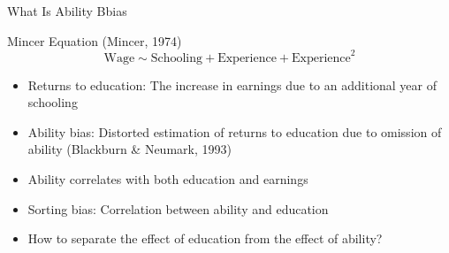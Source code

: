 \documentclass{beamer} %
\begin{document}
\begin{frame}{What Is Ability Bbias}

    \begin{block}{Mincer Equation (Mincer, 1974)}
        \large
        \begin{equation*}
            \text{Wage} \sim \text{Schooling} + \text{Experience} + \text{Experience}^2
        \end{equation*}
    \end{block}

    \begin{itemize}
        \item Returns to education: The increase in earnings due to an additional year of schooling
        \item Ability bias: Distorted estimation of returns to education due to omission of ability (Blackburn \& Neumark, 1993)
        \item Ability correlates with both education and earnings
        \item Sorting bias: Correlation between ability and education
        \item How to separate the effect of education from the effect of ability?
    \end{itemize}

\end{frame}
\end{document}
